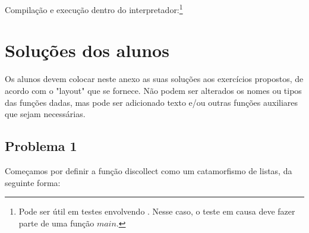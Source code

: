 \documentclass[a4paper]{article}
\newcommand{\Varid}[1]{\mathit{#1}}
\def\resethooks{%
  \global\let\SaveRestoreHook\empty
  \global\let\ColumnHook\empty}
\let\hspre\empty
\let\hspost\empty
\begin{document}
Compilação e execução dentro do interpretador:\footnote{Pode ser útil em testes
envolvendo . Nesse caso, o teste em causa deve fazer parte de uma função
\ensuremath{\Varid{main}}.}
\resethooks


\section{Soluções dos alunos}\label{sec:resolucao}
Os alunos devem colocar neste anexo as suas soluções aos exercícios
propostos, de acordo com o "layout" que se fornece. Não podem ser
alterados os nomes ou tipos das funções dadas, mas pode ser adicionado texto e/ou 
outras funções auxiliares que sejam necessárias.



\subsection*{Problema 1}

\par Começamos por definir a função discollect como um catamorfismo 
de listas, da seguinte forma:
\end{document}

